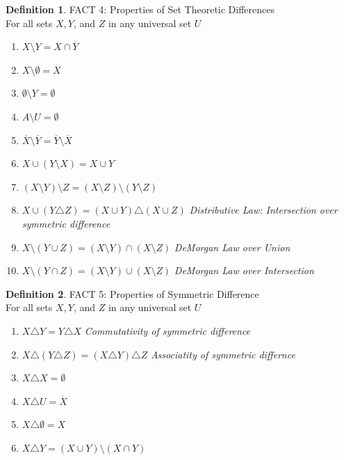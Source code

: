 \documentclass{book}
\theoremstyle{definition}
\newtheorem{definition}{Definition}[section]
\theoremstyle{remark}
\begin{document}
\begin{definition}
FACT 4: Properties of Set Theoretic Differences \\

For all sets $X, Y$, and $Z$ in any universal set $U$ \\

    \begin{enumerate}
        \item $X \setminus Y = X \cap \overline{Y}$
        \item $X \setminus \emptyset = X$
        \item $\emptyset \setminus Y = \emptyset$
        \item $A \setminus U = \emptyset$
        \item $\overline{X} \setminus \overline{Y} = \overline{Y} \setminus \overline{X}$
        \item $X \cup (Y \setminus X) = X \cup Y$    
        \item $(X \setminus Y) \setminus Z = (X \setminus Z) \setminus (Y \setminus Z)$
        \item $X \cup (Y \triangle Z) = (X \cup Y) \triangle (X \cup Z)$ \textit{Distributive Law: Intersection over symmetric difference}
        \item $X \setminus (Y \cup Z) = (X \setminus Y) \cap (X \setminus Z)$ \textit{DeMorgan Law over Union}
        \item $X \setminus (Y \cap Z) = (X \setminus Y) \cup (X \setminus Z)$ \textit{DeMorgan Law over Intersection}
    \end{enumerate}
\end{definition}



\begin{definition}
FACT 5: Properties of Symmetric Difference \\

For all sets $X, Y$, and $Z$ in any universal set $U$ \\

    \begin{enumerate}
        \item $X \triangle Y = Y \triangle X$ \textit{Commutativity of symmetric difference}
        \item $X \triangle (Y \triangle Z) = (X \triangle Y) \triangle Z$ \textit{Associatity of symmetric differnce}
        \item $X \triangle X = \emptyset$
        \item $X \triangle U = \overline{X}$
        \item $X \triangle \emptyset = X$
        \item $X \triangle Y = (X \cup Y) \setminus (X \cap Y)$
    \end{enumerate}
\end{definition}
\end{document}
